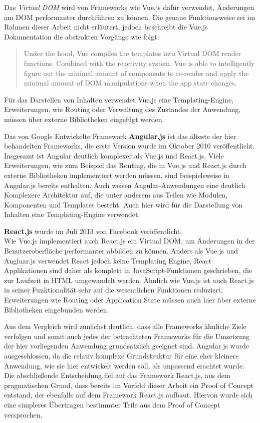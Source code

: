Das \textit{Virtual DOM} wird von Frameworks wie Vue.js dafür verwendet, Änderungen am DOM performanter durchführen zu können. Die genaue Funktionsweise sei im Rahmen dieser Arbeit nicht erläutert, jedoch beschreibt die Vue.js Dokumentation die abstrakten Vorgänge wie folgt:

\begin{quote}
  Under the hood, Vue compiles the templates into Virtual DOM render functions. Combined with the reactivity system, Vue is able to intelligently figure out the minimal amount of components to re-render and apply the minimal amount of DOM manipulations when the app state changes. \cite{VueTemplate}
\end{quote}

Für das Darstellen von Inhalten verwendet Vue.js eine Templating-Engine, Erweiterungen, wie Routing oder Verwaltung des Zustandes der Anwendung, müssen über externe Bibliotheken eingefügt werden.

Das von Google Entwickelte Framework \textbf{Angular.js} \cite{angular} ist das älteste der hier behandelten Frameworks, die erste Version wurde im Oktober 2010 veröffentlicht.\\
Insgesamt ist Angular deutlich komplexer als Vue.js und React.js. Viele Erweiterungen, wie zum Beispiel das Routing, die in Vue.js und React.js durch externe Bibliotheken implementiert werden müssen, sind beispielsweise in Angular.js bereits enthalten.
Auch weisen Angular-Anwendungen eine deutlich Komplexere Architektur auf, die unter anderem aus Teilen wie Modulen, Komponenten und Templates besteht. Auch hier wird für die Darstellung von Inhalten eine Templating-Engine verwendet.

\textbf{React.js} \cite{react} wurde im Juli 2013 von Facebook veröffentlicht.\\
Wie Vue.js implementiert auch React.js ein Virtual DOM, um Änderungen in der Benutzeroberfläche performanter abbilden zu können.
Anders als Vue.js und Angluar.js verwendet React jedoch keine Templating Engine, React Applikationen sind daher als komplett in JavaScript-Funktionen geschrieben, die zur Laufzeit in HTML umgewandelt werden.
Ähnlich wie Vue.js ist auch React.js in seiner Funktionalität sehr auf die wesentlichen Funktionen reduziert, Erweiterungen wie Routing oder Application State müssen auch hier über externe Bibliotheken eingebunden werden.

Aus dem Vergleich wird zunächst deutlich, dass alle Frameworks ähnliche Ziele verfolgen und somit auch jedes der betrachteten Frameworks für die Umsetzung der hier vorliegenden Anwendung grundsätzlich geeignet sind.
Angular.js wurde ausgeschlossen, da die relativ komplexe Grundstruktur für eine eher kleinere Anwendung, wie sie hier entwickelt werden soll, als unpassend erachtet wurde.
Die abschließende Entscheidung fiel auf das Framework React.js, aus dem pragmatischen Grund, dass bereits im Vorfeld dieser Arbeit ein Proof of Concept entstand, der ebenfalls auf dem Framework React.js aufbaut. Hiervon wurde sich eine simpleres Übertragen bestimmter Teile aus dem Proof of Concept versprochen.


